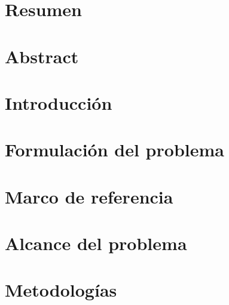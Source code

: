 \documentclass[letterpaper, 11pt, oneside]{book}
\begin{document}


\portada
\contraportada
{}
\agradecimientos

\renewcommand{\contentsname}{Tabla de Contenido}
\tableofcontents
\thispagestyle{empty}

\renewcommand{\listfigurename}{Lista de Figuras}
\listoffigures 
\thispagestyle{empty}

\renewcommand{\listtablename}{Lista de tablas}
\listoftables
\thispagestyle{empty}


\chapter*{Resumen}

\thispagestyle{empty}

\chapter*{Abstract}

\thispagestyle{empty}

\setcounter{page}{1}
\chapter{Introducción}


\chapter{Formulación del problema}


\chapter{Marco de referencia}


\chapter{Alcance del problema}


\chapter{Metodologías}

\end{document}
